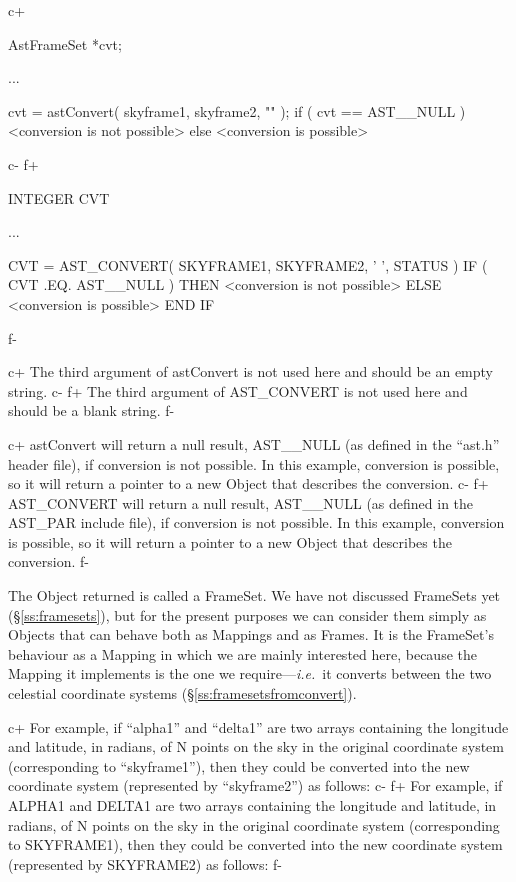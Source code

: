 \documentclass[twoside,11pt]{starlink}
\providecommand{\secref}[1]{\S\ref{#1}}
\begin{document}
c+
\small
\begin{terminalv}
AstFrameSet *cvt;

...

cvt = astConvert( skyframe1, skyframe2, "" );
if ( cvt == AST__NULL ) {
   <conversion is not possible>
} else {
   <conversion is possible>
}
\end{terminalv}
\normalsize
c-
f+
\small
\begin{terminalv}
      INTEGER CVT

      ...

      CVT = AST_CONVERT( SKYFRAME1, SKYFRAME2, ' ', STATUS )
      IF ( CVT .EQ. AST__NULL ) THEN
         <conversion is not possible>
      ELSE
         <conversion is possible>
      END IF
\end{terminalv}
\normalsize
f-

c+
The third argument of astConvert is not used here and should be an
empty string.
c-
f+
The third argument of AST\_CONVERT is not used here and should be a
blank string.
f-

c+
astConvert will return a null result, AST\_\_NULL (as defined in the
``ast.h'' header file), if conversion is not possible. In this
example, conversion is possible, so it will return a pointer to a new
Object that describes the conversion.
c-
f+
AST\_CONVERT will return a null result, AST\_\_NULL (as defined in the
AST\_PAR include file), if conversion is not possible. In this
example, conversion is possible, so it will return a pointer to a new
Object that describes the conversion.
f-

The Object returned is called a FrameSet. We have not discussed
FrameSets yet (\secref{ss:framesets}), but for the present purposes we
can consider them simply as Objects that can behave both as Mappings
and as Frames. It is the FrameSet's behaviour as a Mapping in which we
are mainly interested here, because the Mapping it implements is the
one we require---\emph{i.e.}\ it converts between the two celestial
coordinate systems (\secref{ss:framesetsfromconvert}).

c+
For example, if ``alpha1'' and ``delta1'' are two arrays containing
the longitude and latitude, in radians, of N points on the sky in the
original coordinate system (corresponding to ``skyframe1''), then they
could be converted into the new coordinate system (represented by
``skyframe2'') as follows:
c-
f+
For example, if ALPHA1 and DELTA1 are two arrays containing the
longitude and latitude, in radians, of N points on the sky in the
original coordinate system (corresponding to SKYFRAME1), then they
could be converted into the new coordinate system (represented by
SKYFRAME2) as follows:
f-
\end{document}
